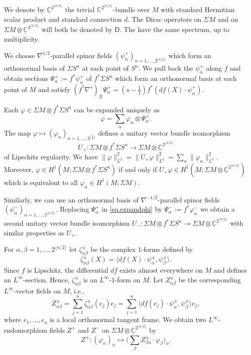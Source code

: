 \documentclass[11pt,reqno]{amsart}
\newcommand{\ns}{\nabla^s}
\newcommand{\spindim}{2^{\lfloor n/2\rfloor}}
\newcommand{\Ctriv}{\underline{\mathbb{C}}^{\spindim}}
\newcommand{\C}{\mathbb{C}}
\newcommand{\D}{\mathsf{D}}
\renewcommand{\phi}{\varphi}
\newcommand{\<}{\langle}
\renewcommand{\>}{\rangle}
\theoremstyle{definition}
\begin{document}
We denote by $\Ctriv$ the trivial $\C^{\spindim}$-bundle over $M$ with standard Hermitian scalar product and standard connection $d$.
The Dirac operators on $\Sigma M$ and on $\Sigma M\otimes \Ctriv$ will both be denoted by $\D$.
The have the same spectrum, up to multiplicity.

We choose $\nabla^{1/2}$-parallel spinor fields $(\psi_\alpha^+)_{\alpha=1,\dots,\spindim}$ which form an orthonormal basis of $\Sigma S^n$ at each point of $S^n$.
We pull back the $\psi_\alpha^+$ along $f$ and obtain sections $\Psi_\alpha^+:=f^*\psi_\alpha^+$ of $f^*\Sigma S^n$ which form an orthonormal basis at each point of $M$ and satisfy $(f^*\ns)_X\Psi_\alpha^+ = (s-\frac12) f^*(df(X)\cdot \psi_\alpha^+)$.

Each $\phi\in\Sigma M\otimes f^*\Sigma S^n$ can be expanded uniquely as
\begin{equation}
\phi = \sum_\alpha \phi_\alpha \otimes \Psi_\alpha^+ .
\label{eq.expandphi}
\end{equation}
The map $\phi\mapsto (\phi_\alpha)_{\alpha=1,\dots,2^{\lfloor\frac{n}{2}\rfloor}}$ defines a unitary vector bundle isomorphism 
\begin{equation}
U_+\colon \Sigma M\otimes f^*\Sigma S^n \to \Sigma M\otimes \Ctriv
\label{eq.defU+}
\end{equation}
of Lipschitz regularity.
We have $\|\phi\|_{L^2}^2 = \|U_+\phi\|_{L^2}^2 = \sum_\alpha\|\phi_\alpha\|_{L^2}^2$.
Moreover, $\phi\in H^1(M;\Sigma M\otimes f^*\Sigma S^n)$ if and only if $U_+\phi\in H^1(M;\Sigma M\otimes \Ctriv)$  which is equivalent to all $\phi_\alpha\in H^1(M;\Sigma M)$.

Similarly, we can use an orthonormal basis of $\nabla^{-1/2}$-parallel spinor fields $(\psi_\alpha^-)_{\alpha=1,\dots,\spindim}$.
Replacing $\Psi_\alpha^+$ in \eqref{eq.expandphi} by $\Psi_\alpha^- := f^*\phi_\alpha^-$ we obtain a second unitary vector bundle isomorphism $U_-\colon \Sigma M\otimes f^*\Sigma S^n \to \Sigma M\otimes \Ctriv$ with similar properties as $U_+$.

For $\alpha,\beta=1,\dots,\spindim$ let $\zeta_{\alpha\beta}^\pm$ be the complex $1$-forms defined by
\begin{equation}
\zeta_{\alpha\beta}^\pm(X) = \< df(X)\cdot \psi_\alpha^\pm,\psi_\beta^\pm\> .
\label{eq.defzeta}
\end{equation}
Since $f$ is Lipschitz, the differential $df$ exists almost everywhere on $M$ and defines an $L^\infty$-section.
Hence, $\zeta_{\alpha\beta}^\pm$ is an $L^\infty$-$1$-form on $M$.
Let $Z_{\alpha\beta}^\pm$ be the corresponding $L^\infty$-vector fields on $M$, i.e.,
\[
Z_{\alpha\beta} ^\pm
= 
\sum_{j=1}^n \zeta_{\alpha\beta}^\pm(e_j)e_j
=
\sum_{j=1}^n \< df(e_j)\cdot \psi_\alpha^\pm,\psi_\beta^\pm\>e_j,
\]
where $e_1,\dots,e_n$ is a local orthonormal tangent frame.
We obtain two $L^\infty$-endomorphism fields $Z^+$ and $Z^-$ on $\Sigma M\otimes \Ctriv$ by
$$
Z^\pm\colon (\phi_\alpha)_\alpha \mapsto \Big(\sum_\beta Z_{\beta\alpha}^\pm \cdot \phi_\beta\Big)_\alpha .
$$
\end{document}
